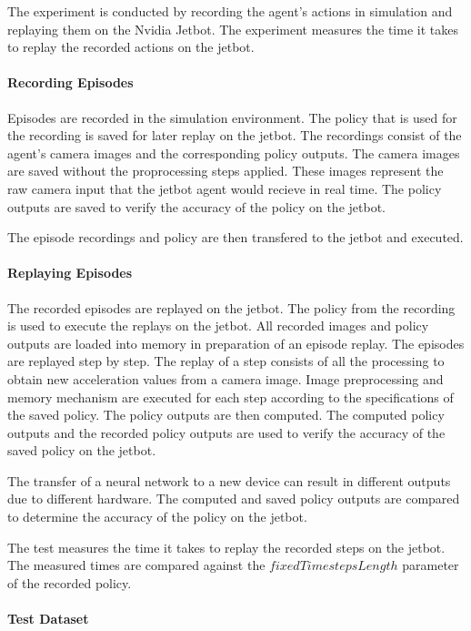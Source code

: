The experiment is conducted by recording the agent's actions in simulation and replaying them on the Nvidia Jetbot. The experiment measures the time it takes to replay the recorded actions on the jetbot.

\paragraph{Recording Episodes}

Episodes are recorded in the simulation environment. The policy that is used for the recording is saved for later replay on the jetbot.
The recordings consist of the agent's camera images and the corresponding policy outputs. The camera images are saved without the proprocessing steps applied. These images represent the raw camera input that the jetbot agent would recieve in real time. The policy outputs are saved to verify the accuracy of the policy on the jetbot.

The episode recordings and policy are then transfered to the jetbot and executed.

\paragraph{Replaying Episodes}

The recorded episodes are replayed on the jetbot. The policy from the recording is used to execute the replays on the jetbot. All recorded images and policy outputs are loaded into memory in preparation of an episode replay.
The episodes are replayed step by step. The replay of a step consists of all the processing to obtain new acceleration values from a camera image. Image preprocessing and memory mechanism are executed for each step according to the specifications of the saved policy. The policy outputs are then computed. The computed policy outputs and the recorded policy outputs are used to verify the accuracy of the saved policy on the jetbot.

The transfer of a neural network to a new device can result in different outputs due to different hardware. The computed and saved policy outputs are compared to determine the accuracy of the policy on the jetbot.

The test measures the time it takes to replay the recorded steps on the jetbot.
The measured times are compared against the $fixedTimestepsLength$ parameter of the recorded policy.


\paragraph{Test Dataset}

